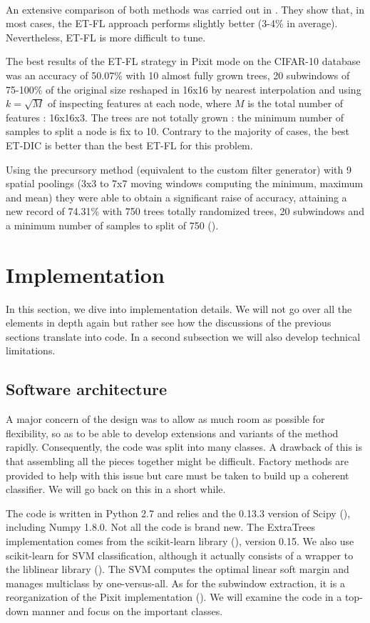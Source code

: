 \documentclass[a4paper]{report}
\begin{document}
		\paragraph{}
		An extensive comparison of both methods was carried out in \cite{base}. They show that, in most cases, the ET-FL approach performs slightly better (3-4\% in average). Nevertheless, ET-FL is more difficult to tune. 
		\par
		The best results of the ET-FL strategy in Pixit mode on the CIFAR-10 database was an accuracy of 50.07\% with 10 almost fully grown trees, 20 subwindows of 75-100\% of the original size reshaped in 16x16 by nearest interpolation and using $k = \sqrt{M}$ of inspecting features at each node, where $M$ is the total number of features : 16x16x3. The trees are not totally grown : the minimum number of samples to split a node is fix to 10. Contrary to the majority of cases, the best ET-DIC is better than the best ET-FL for this problem.
	\par
	Using the precursory method (equivalent to the custom filter generator) with 9 spatial poolings (3x3 to 7x7 moving windows computing the minimum, maximum and mean) they were able to obtain a significant raise of accuracy, attaining a new record of 74.31\% with 750 trees totally randomized trees, 20 subwindows and a minimum number of samples to split of 750 (\cite{base}).
			

	
	\section{Implementation}
	
	In this section, we dive into implementation details. We will not go over all the elements in depth again but rather see how the discussions of the previous sections translate into code. In a second subsection we will also develop technical limitations.
		\subsection{Software architecture}
		A major concern of the design was to allow as much room as possible for flexibility, so as to be able to develop extensions and variants of the method rapidly. Consequently, the code was split into many classes. A drawback of this is that assembling all the pieces together might be difficult. Factory methods are provided to help with this issue but care must be taken to build up a coherent classifier. We will go back on this in a short while. 
		\par
		The code is written in Python 2.7 and relies and the 0.13.3 version of Scipy (\cite{scipy}), including Numpy 1.8.0. Not all the code is brand new. The ExtraTrees implementation comes from the scikit-learn library (\cite{sklearn}), version 0.15. We also use scikit-learn for SVM classification, although it actually consists of a wrapper to the liblinear library (\cite{liblinear}). The SVM computes the optimal linear soft margin and manages multiclass by one-versus-all.
				As for the subwindow extraction, it is a reorganization of the Pixit implementation (\cite{cytomine}).
		We will examine the code in a top-down manner and focus on the important classes.
\end{document}
